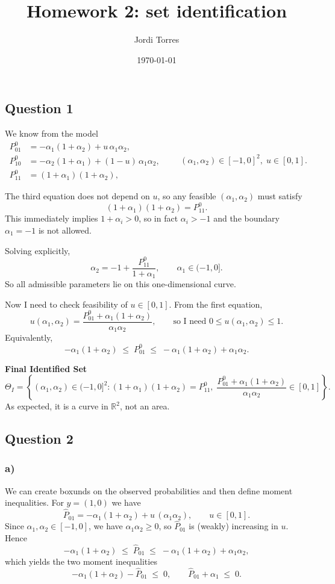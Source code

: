 \documentclass{article}
\begin{document}
\title{Homework 2: set identification}
\author{Jordi Torres}
\date{\today}


\maketitle


\subsection*{Question 1}
We know from the model
\[
\begin{aligned}
P^0_{01} &= -\alpha_1(1+\alpha_2) + u\,\alpha_1\alpha_2,\\
P^0_{10} &= -\alpha_2(1+\alpha_1) + (1-u)\,\alpha_1\alpha_2,\\
P^0_{11} &= (1+\alpha_1)(1+\alpha_2),
\end{aligned}
\qquad
(\alpha_1,\alpha_2)\in[-1,0]^2,\; u\in[0,1].
\]

The third equation does not depend on $u$, so any feasible $(\alpha_1,\alpha_2)$ must satisfy
\[
(1+\alpha_1)(1+\alpha_2) = P^0_{11}.
\]
This immediately implies $1+\alpha_i>0$, so in fact $\alpha_i>-1$ and the boundary $\alpha_1=-1$ is not allowed.

Solving explicitly,
\[
\alpha_2 = -1 + \frac{P^0_{11}}{1+\alpha_1}, \qquad \alpha_1\in(-1,0].
\]
So all admissible parameters lie on this one-dimensional curve.

Now I need to check feasibility of $u\in[0,1]$. From the first equation,
\[
u(\alpha_1,\alpha_2) = \frac{P^0_{01} + \alpha_1(1+\alpha_2)}{\alpha_1\alpha_2},
\qquad\text{so I need } 0 \le u(\alpha_1,\alpha_2) \le 1.
\]
Equivalently,
\[
-\alpha_1(1+\alpha_2) \;\le\; P^0_{01} \;\le\; -\alpha_1(1+\alpha_2)+\alpha_1\alpha_2.
\]

\bigskip

\textbf{Final Identified Set}
\[
\Theta_I = \left\{
(\alpha_1,\alpha_2)\in(-1,0]^2 :
(1+\alpha_1)(1+\alpha_2)=P^0_{11},\;
\frac{P^0_{01} + \alpha_1(1+\alpha_2)}{\alpha_1\alpha_2}\in[0,1]
\right\}.
\]
As expected, it is a curve in $\mathbb{R}^2$, not an area.


\subsection*{Question 2}

\subsubsection*{a)}
We can create boxunds on the observed probabilities and then define moment inequalities. For $y=(1,0)$ we have
\[
\hat P_{01} = -\alpha_1(1+\alpha_2) + u\,(\alpha_1\alpha_2), \qquad u\in[0,1].
\]
Since $\alpha_1,\alpha_2\in[-1,0]$, we have $\alpha_1\alpha_2\ge 0$, so $\hat P_{01}$ is (weakly) increasing in $u$. Hence
\[
-\alpha_1(1+\alpha_2) \;\le\; \hat P_{01} \;\le\; -\alpha_1(1+\alpha_2) + \alpha_1\alpha_2,
\]
which yields the two moment inequalities
\[
-\alpha_1(1+\alpha_2) - \hat P_{01} \;\le\; 0,
\qquad
\hat P_{01} + \alpha_1 \;\le\; 0.
\]
\end{document}
